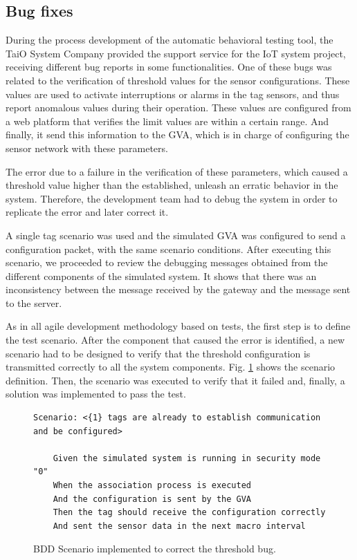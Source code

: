 \documentclass[journal]{IEEEtran}	%
\begin{document}
\subsection{Bug fixes}


During the process development of the automatic behavioral testing tool, the TaiO System Company provided the support service for the IoT system project, receiving different bug reports in some functionalities. One of these bugs was related to the verification of threshold values for the sensor configurations. These values are used to activate interruptions or alarms in the tag sensors, and thus report anomalous values during their operation. These values are configured from a web platform that verifies the limit values are within a certain range. And finally, it send this information to the GVA, which is in charge of configuring the sensor network with these parameters.

The error due to a failure in the verification of these parameters, which caused a threshold value higher than the established, unleash an erratic behavior in the system. Therefore, the development team had to debug the system in order to replicate the error and later correct it.

A single tag scenario was used and the simulated GVA was configured to send a configuration packet, with the same scenario conditions. After executing this scenario, we proceeded to review the debugging messages obtained from the different components of the simulated system. It shows that there was an inconsistency between the message received by the gateway and the message sent to the server.

As in all agile development methodology based on tests, the first step is to define the test scenario. After the component that caused the error is identified, a new scenario had to be designed to verify that the threshold configuration is transmitted correctly to all the system components. Fig. \ref{fig:bddBug} shows the scenario definition. Then, the scenario was executed to verify that it failed and, finally, a solution was implemented to pass the test.

\begin{figure}[t!]
\centering
\begin{lstlisting}[style=scenarioStyle]
Scenario: <{1} tags are already to establish communication and be configured>
    
    Given the simulated system is running in security mode "0"
    When the association process is executed
    And the configuration is sent by the GVA
    Then the tag should receive the configuration correctly
    And sent the sensor data in the next macro interval
\end{lstlisting}
\caption{BDD Scenario implemented to correct the threshold bug.}
\label{fig:bddBug}
\end{figure}
\end{document}
